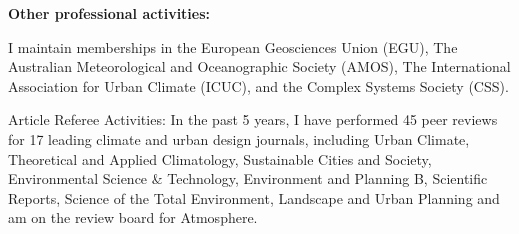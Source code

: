 \textbf{Other professional activities:}

I maintain memberships in the European Geosciences Union (EGU), The Australian Meteorological and Oceanographic Society (AMOS), The International Association for Urban Climate (ICUC), and the Complex Systems Society (CSS).

Article Referee Activities: In the past 5 years, I have performed 45 peer reviews for 17 leading climate and urban design journals, including Urban Climate, Theoretical and Applied Climatology, Sustainable Cities and Society, Environmental Science \& Technology, Environment and Planning B, Scientific Reports, Science of the Total Environment, Landscape and Urban Planning and am on the review board for Atmosphere.




%
